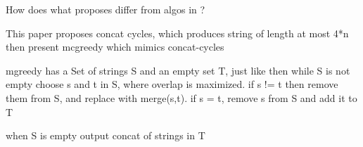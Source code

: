 \documentclass[letterpaper,twocolumn,11pt,titlepage]{article}
\begin{document}
How does what \cite{li1990towards} proposes differ from algos in \cite{tarhio1988greedy}\cite{turner1989approximation}?


This paper proposes concat cycles, which produces string of length at most 4*n
then present mcgreedy which mimics concat-cycles

mgreedy has a Set of strings S and an empty set T, just like \cite{li1990towards}
then while S is not empty choose s and t in S, where overlap is maximized.  if s != t
then remove them from S, and replace with merge(s,t).  if s = t, remove s from S and add it to T

when S is empty output concat of strings in T


{
  \small 
  
  
}
\end{document}

